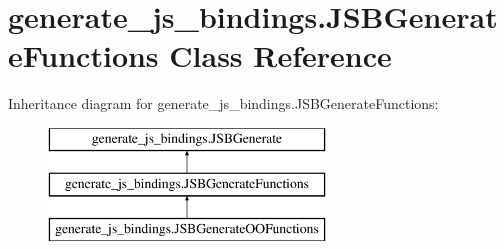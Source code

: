\hypertarget{classgenerate__js__bindings_1_1_j_s_b_generate_functions}{\section{generate\-\_\-js\-\_\-bindings.\-J\-S\-B\-Generate\-Functions Class Reference}
\label{classgenerate__js__bindings_1_1_j_s_b_generate_functions}
}
Inheritance diagram for generate\-\_\-js\-\_\-bindings.\-J\-S\-B\-Generate\-Functions\-:\begin{figure}[H]
\begin{center}
\leavevmode
\includegraphics[height=3.000000cm]{classgenerate__js__bindings_1_1_j_s_b_generate_functions}
\end{center}
\end{figure}
